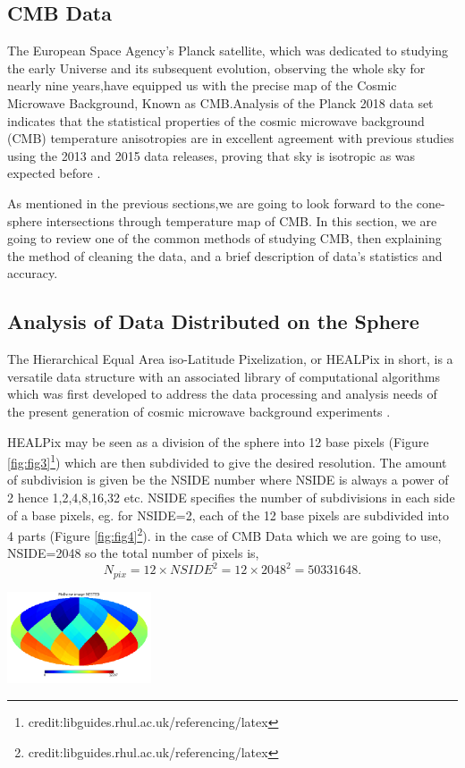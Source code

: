 \documentclass{article}
\begin{document}
\begin{multicols}{2}
\section{CMB Data}
The European Space Agency’s Planck satellite, which was dedicated to studying the early Universe and its subsequent evolution, observing the whole sky for nearly nine years,have equipped us with the precise map of the Cosmic Microwave Background, Known as CMB.Analysis of the Planck 2018 data set indicates that the statistical properties of the cosmic microwave background (CMB) temperature anisotropies are in excellent agreement with previous studies using the 2013 and 2015 data releases, proving that sky is isotropic as was expected before \cite{planck1}.

As mentioned in the previous sections,we are going to look forward to the cone-sphere intersections through temperature map of CMB. In this section, we are going to review one of the common methods of studying CMB, then explaining the method of cleaning the data, and a brief description of data's statistics and accuracy.

\subsection{Analysis of Data Distributed on the Sphere}
The Hierarchical Equal Area iso-Latitude Pixelization, or HEALPix in short, is a versatile data structure with an associated library of computational algorithms which was first developed to address the data processing and analysis needs of the present generation of cosmic microwave background experiments \cite{healpix}. 

HEALPix may be seen as a division of the sphere into 12 base pixels (Figure \ref{fig:fig3}\footnote{credit:libguides.rhul.ac.uk/referencing/latex}) which are then subdivided to give the desired resolution. The amount of subdivision is given be the NSIDE number where NSIDE is always a power of 2 hence 1,2,4,8,16,32 etc. NSIDE specifies the number of subdivisions in each side of a base pixels, eg. for NSIDE=2, each of the 12 base pixels are subdivided into 4 parts (Figure \ref{fig:fig4}\footnote{credit:libguides.rhul.ac.uk/referencing/latex}).
in the case of CMB Data which we are going to use, NSIDE=2048 so the total number of pixels is,
\begin{equation}
    N_{pix} = 12\times NSIDE^2 = 12\times 2048^2 = 50331648 .
\end{equation}

\hspace{+1.8cm}\includegraphics[width=0.32\textwidth]{moll_nside32_nest.png}
\label{fig:fig3}


\end{multicols}
\end{document}
